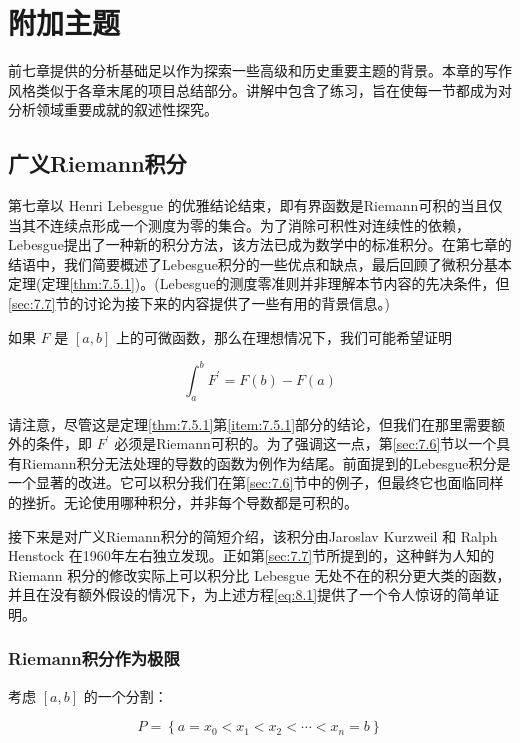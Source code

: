 \chapter{附加主题}
\label{chap:8}
前七章提供的分析基础足以作为探索一些高级和历史重要主题的背景。本章的写作风格类似于各章末尾的项目总结部分。讲解中包含了练习，旨在使每一节都成为对分析领域重要成就的叙述性探究。

\section{广义Riemann积分}
\label{sec:8.1}
第七章以 Henri Lebesgue 的优雅结论结束，即有界函数是Riemann可积的当且仅当其不连续点形成一个测度为零的集合。为了消除可积性对连续性的依赖，Lebesgue提出了一种新的积分方法，该方法已成为数学中的标准积分。在第七章的结语中，我们简要概述了Lebesgue积分的一些优点和缺点，最后回顾了微积分基本定理(定理\ref{thm:7.5.1})。(Lebesgue的测度零准则并非理解本节内容的先决条件，但\ref{sec:7.7}节的讨论为接下来的内容提供了一些有用的背景信息。)

如果 \(F\) 是 \(\left\lbrack  {a,b}\right\rbrack\) 上的可微函数，那么在理想情况下，我们可能希望证明

\begin{equation}
\label{eq:8.1}
{\int }_{a}^{b}{F}^{\prime } = F\left( b\right)  - F\left( a\right)
\end{equation}


请注意，尽管这是定理\ref{thm:7.5.1}第\ref{item:7.5.1}部分的结论，但我们在那里需要额外的条件，即 \({F}^{\prime }\) 必须是Riemann可积的。为了强调这一点，第\ref{sec:7.6}节以一个具有Riemann积分无法处理的导数的函数为例作为结尾。前面提到的Lebesgue积分是一个显著的改进。它可以积分我们在第\ref{sec:7.6}节中的例子，但最终它也面临同样的挫折。无论使用哪种积分，并非每个导数都是可积的。

接下来是对广义Riemann积分的简短介绍，该积分由Jaroslav Kurzweil 和 Ralph Henstock 在1960年左右独立发现。正如第\ref{sec:7.7}节所提到的，这种鲜为人知的 Riemann 积分的修改实际上可以积分比 Lebesgue 无处不在的积分更大类的函数，并且在没有额外假设的情况下，为上述方程\eqref{eq:8.1}提供了一个令人惊讶的简单证明。

\subsection{Riemann积分作为极限}

考虑 $[a,b]$ 的一个分割：

\[
P = \left\{  {a = {x}_{0} < {x}_{1} < {x}_{2} < \cdots  < {x}_{n} = b}\right\}
\]


